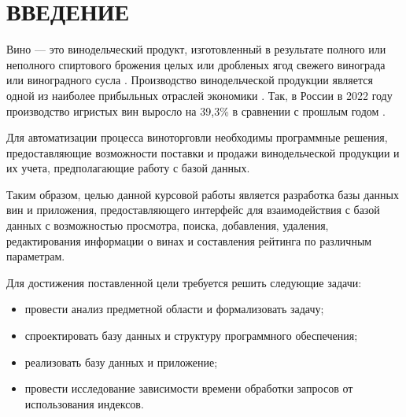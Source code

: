 \chapter*{ВВЕДЕНИЕ}

Вино --- это винодельческий продукт, изготовленный в результате полного или неполного спиртового брожения целых или дробленых ягод свежего винограда или виноградного сусла \cite{wine}. Производство винодельческой продукции является одной из наиболее прибыльных отраслей экономики \cite{economy}. Так, в России в 2022 году производство игристых вин выросло на 39,3\% в сравнении с прошлым годом \cite{growth}.

Для автоматизации процесса виноторговли необходимы программные решения, предоставляющие возможности поставки и продажи винодельческой продукции и их учета, предполагающие работу с базой данных.

Таким образом, целью данной курсовой работы является разработка базы данных вин и приложения, предоставляющего интерфейс для взаимодействия с базой данных с возможностью просмотра, поиска, добавления, удаления, редактирования информации о винах и составления рейтинга по различным параметрам.

Для достижения поставленной цели требуется решить следующие задачи:

\begin{itemize}
	\item провести анализ предметной области и формализовать задачу;
	\item спроектировать базу данных и структуру программного обеспечения;
	\item реализовать базу данных и приложение;
	\item провести исследование зависимости времени обработки запросов от использования индексов.
\end{itemize}